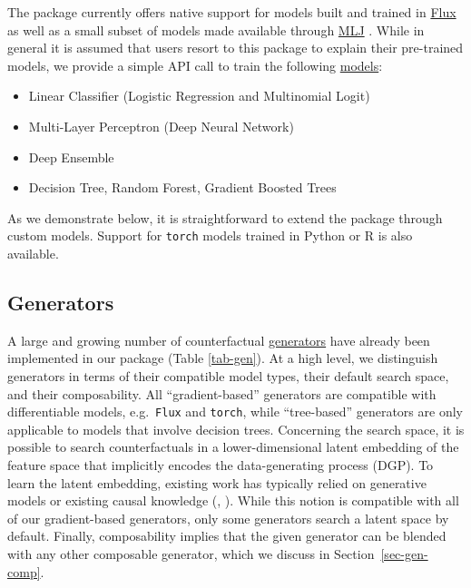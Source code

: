 \documentclass[
  letterpaper,
  DIV=11,
  numbers=noendperiod]{scrartcl}
\begin{document}
The package currently offers native support for models built and trained
in \href{https://fluxml.ai/}{Flux} \cite{innes2018flux} as well as a
small subset of models made available through
\href{https://alan-turing-institute.github.io/MLJ.jl/dev/}{MLJ}
\cite{blaom2020mlj}. While in general it is assumed that users resort to
this package to explain their pre-trained models, we provide a simple
API call to train the following
\href{https://juliatrustworthyai.github.io/CounterfactualExplanations.jl/v0.1/tutorials/model_catalogue/}{models}:

\begin{itemize}
\item Linear Classifier (Logistic Regression and Multinomial Logit)
\item Multi-Layer Perceptron (Deep Neural Network)
\item Deep Ensemble \cite{lakshminarayanan2016simple}
\item Decision Tree, Random Forest, Gradient Boosted Trees
\end{itemize}

As we demonstrate below, it is straightforward to extend the package
through custom models. Support for \texttt{torch} models trained in
Python or R is also available.

\hypertarget{sec-gen}{%
\subsection{Generators}\label{sec-gen}}

A large and growing number of counterfactual
\href{https://juliatrustworthyai.github.io/CounterfactualExplanations.jl/v0.1/explanation/generators/overview/}{generators}
have already been implemented in our package (Table \ref{tab-gen}). At a
high level, we distinguish generators in terms of their compatible model
types, their default search space, and their composability. All
``gradient-based'' generators are compatible with differentiable models,
e.g.~\texttt{Flux} and \texttt{torch}, while ``tree-based'' generators
are only applicable to models that involve decision trees. Concerning
the search space, it is possible to search counterfactuals in a
lower-dimensional latent embedding of the feature space that implicitly
encodes the data-generating process (DGP). To learn the latent
embedding, existing work has typically relied on generative models or
existing causal knowledge (\cite{joshi2019realistic},
\cite{karimi2021algorithmic}). While this notion is compatible with all
of our gradient-based generators, only some generators search a latent
space by default. Finally, composability implies that the given
generator can be blended with any other composable generator, which we
discuss in Section~\ref{sec-gen-comp}.
\end{document}
